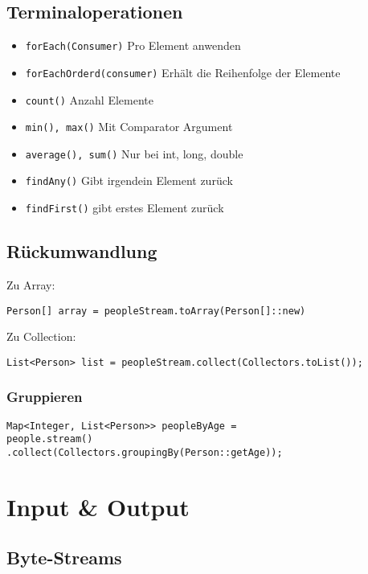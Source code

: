 \begin{multicols*}{5}
	\subsection{Terminaloperationen}
		\begin{itemize}
			\item \tiny \textcolor{b}{\texttt{forEach(Consumer)}}
				\footnotesize Pro Element anwenden
			\item \tiny \textcolor{b}{\texttt{forEachOrderd(consumer)}}
				\footnotesize Erhält die Reihenfolge der Elemente
			\item \tiny \textcolor{b}{\texttt{count()}}
				\footnotesize Anzahl Elemente
			\item \tiny \textcolor{b}{\texttt{min(), max()}}
				\footnotesize Mit Comparator Argument
			\item \tiny \textcolor{b}{\texttt{average(), sum()}}
				\footnotesize Nur bei int, long, double
			\item \tiny \textcolor{b}{\texttt{findAny()}}
				\footnotesize Gibt irgendein Element zurück
			\item \tiny \textcolor{b}{\texttt{findFirst()}}
				\footnotesize gibt erstes Element zurück
		\end{itemize}
	\subsection{Rückumwandlung}
		\textcolor{b}{Zu Array:}
		\begin{lstlisting}
Person[] array = peopleStream.toArray(Person[]::new)
		\end{lstlisting}
		\textcolor{b}{Zu Collection:}
		\begin{lstlisting}
List<Person> list = peopleStream.collect(Collectors.toList());
		\end{lstlisting}	
		\subsubsection{Gruppieren}
			\begin{lstlisting}
Map<Integer, List<Person>> peopleByAge = 
people.stream()
.collect(Collectors.groupingBy(Person::getAge));
			\end{lstlisting}




\section{Input \& Output}
	\subsection{Byte-Streams}

\end{multicols*}
